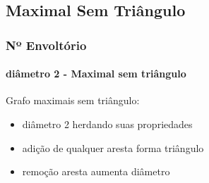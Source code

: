 \subsection{Maximal Sem Triângulo}
\begin{frame}
\frametitle{Nº Envoltório}
\framesubtitle{diâmetro 2 - Maximal sem triângulo}
\begin{properties}
Grafo maximais sem triângulo:
\begin{itemize}
    \item diâmetro 2 herdando suas propriedades
    \item adição de qualquer aresta forma triângulo
    \item remoção aresta aumenta diâmetro
\end{itemize}
\end{properties}
\end{frame}

